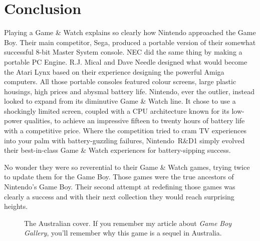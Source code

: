 \documentclass{book}
\begin{document}
\FloatBarrier\section*{Conclusion}
Playing a Game \& Watch explains so clearly how Nintendo approached the Game Boy. Their main competitor, Sega, produced a portable version of their somewhat successful 8-bit Master System console. NEC did the same thing by making a portable PC Engine. R.J. Mical and Dave Needle designed what would become the Atari Lynx based on their experience designing the powerful Amiga computers. All those portable consoles featured colour screens, large plastic housings, high prices and abysmal battery life. Nintendo, ever the outlier, instead looked to expand from its diminutive Game \& Watch line. It chose to use a shockingly limited screen, coupled with a CPU architecture known for its low-power qualities, to achieve an impressive fifteen to twenty hours of battery life with a competitive price. Where the competition tried to cram TV experiences into your palm with battery-guzzling failures, Nintendo~R\&D1 simply evolved their best-in-class Game \& Watch experiences for battery-sipping success.\par
No wonder they were so reverential to their Game \& Watch games, trying twice to update them for the Game Boy. Those games were the true ancestors of Nintendo’s Game Boy. Their second attempt at redefining those games was clearly a success and with their next collection they would reach surprising heights.\par
\FloatBarrier\vspace{\baselineskip}\begin{figure}[H]\caption*{The Australian cover. If you remember my article about \emph{Game Boy Gallery}, you’ll remember why this game is a sequel in Australia.}\end{figure}
\end{document}
